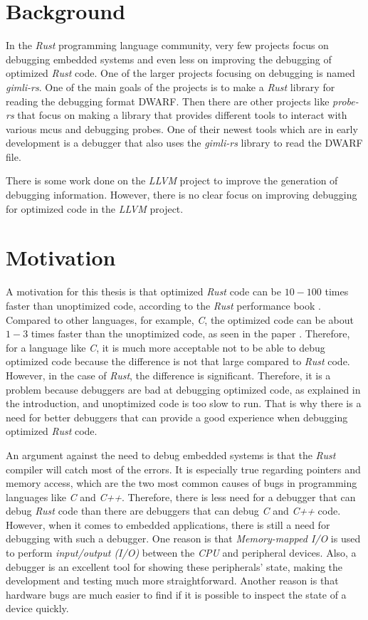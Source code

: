 \section{Background}
In the \emph{Rust} programming language community, very few projects focus on debugging embedded systems and even less on improving the debugging of optimized \emph{Rust} code.
One of the larger projects focusing on debugging is named \emph{gimli-rs}.
One of the main goals of the projects is to make a \emph{Rust} library for reading the debugging format \gls{DWARF}.
Then there are other projects like \emph{probe-rs} that focus on making a library that provides different tools to interact with various \glspl{mcu} and debugging probes.
One of their newest tools which are in early development is a debugger that also uses the \emph{gimli-rs} library to read the DWARF file.


There is some work done on the \emph{LLVM} project to improve the generation of debugging information.
However, there is no clear focus on improving debugging for optimized code in the \emph{LLVM} project.


\section{Motivation}
A motivation for this thesis is that optimized \emph{Rust} code can be $10-100$ times faster than unoptimized code, according to the \emph{Rust} performance book \cite{perf-book}.
Compared to other languages, for example, \emph{C}, the optimized code can be about $1-3$ times faster than the unoptimized code, as seen in the paper \cite{clang-opt}.
Therefore, for a language like \emph{C}, it is much more acceptable not to be able to debug optimized code because the difference is not that large compared to \emph{Rust} code.
However, in the case of \emph{Rust}, the difference is significant.
Therefore, it is a problem because debuggers are bad at debugging optimized code, as explained in the introduction, and unoptimized code is too slow to run.
That is why there is a need for better debuggers that can provide a good experience when debugging optimized \emph{Rust} code.


An argument against the need to debug embedded systems is that the \emph{Rust} compiler will catch most of the errors.
It is especially true regarding pointers and memory access, which are the two most common causes of bugs in programming languages like \emph{C} and \emph{C++}.
Therefore, there is less need for a debugger that can debug \emph{Rust} code than there are debuggers that can debug \emph{C} and \emph{C++} code.
However, when it comes to embedded applications, there is still a need for debugging with such a debugger.
One reason is that \emph{Memory-mapped I/O} is used to perform \emph{input/output (I/O)} between the \emph{CPU} and peripheral devices.
Also, a debugger is an excellent tool for showing these peripherals' state, making the development and testing much more straightforward.
Another reason is that hardware bugs are much easier to find if it is possible to inspect the state of a device quickly.


